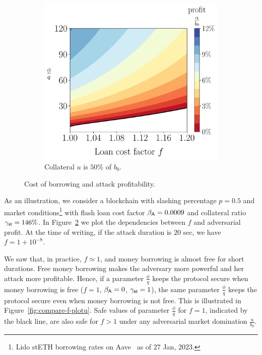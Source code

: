 \begin{figure}[htb]
\begin{subfigure}{0.49\textwidth}
     \includegraphics[width=\textwidth]{./figures/plotf50.pdf}
     \caption{Collateral $u$ is $50\%$ of $b_0$.}
     \label{fig:plotf50}
   \end{subfigure}
   \caption{Cost of borrowing and attack profitability.}
   \label{fig:plotf}
 \end{figure}

 As an illustration,
 we consider a blockchain with slashing percentage
 $p = 0.5$ and market conditions\footnote{Lido stETH borrowing rates
 on Aave~\cite{aave} as of 27 Jan, 2023.}
 with \asset flash loan cost factor $\beta_{\textsf{A}} = 0.0009$ and
 collateral ratio $\gamma_{\textsf{st}} = 146\%$.
 In Figure~\ref{fig:plotf} we plot the dependencies between $f$ and adversarial
 profit. At the time of writing, if the attack duration is $20$ sec, we have
 $f = 1 + 10^{-8}$.

We saw that, in practice, $f \simeq 1$, and money borrowing is almost free
for short durations. Free money borrowing makes the adversary more powerful
and her attack more profitable.
Hence, if a parameter $\frac{\phi}{q}$ keeps the protocol secure when money
borrowing is free ($f = 1$, $\beta_{\textsf{A}} = 0$, $\gamma_{\textsf{st}} = 1$),
the same parameter $\frac{\phi}{q}$ keeps the protocol secure even when
money borrowing is not free. This is illustrated in
Figure~\ref{fig:compare-f-plotu}. Safe values of parameter $\frac{\phi}{q}$
for $f = 1$, indicated by the black line, are also safe for $f > 1$
under any adversarial market domination $\frac{u}{b_0}$.

